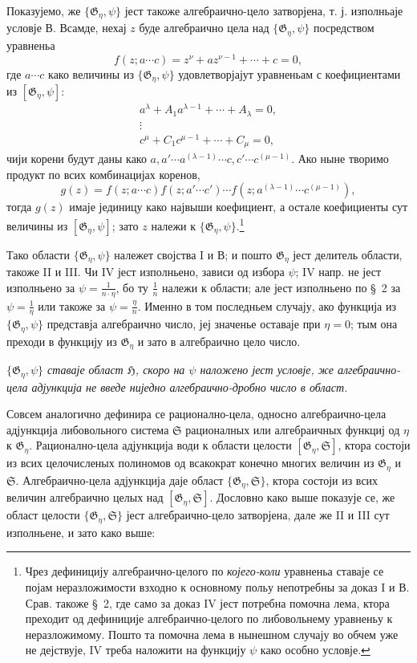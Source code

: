﻿\documentclass[11pt]{article}
\newlength{\sectionfourpageextra}
\begin{document}
Показујемо, же $\{\mathfrak G_\eta,\psi\}$ јест такоже алгебраично-цело
затворјена, т. ј. изполньаје условје В. Всамде, нехај $z$ буде алгебраично
цела над $\{\mathfrak G_\eta,\psi\}$ посредством уравненьа
\enlargethispage{\sectionfourpageextra}
\[
 f(z;a\cdots c)=z^\nu+a z^{\nu-1}+\cdots+c=0,
\]
где $a\cdots c$ како величины из $\{\mathfrak G_\eta,\psi\}$ удовлетворјајут
уравненьам с коефициентами из $[\mathfrak G_\eta,\psi]$:
\[
\begin{gathered}
 a^\lambda+A_1a^{\lambda-1}+\cdots+A_\lambda=0,\\
 \vdots\\
 c^\mu+C_1c^{\mu-1}+\cdots+C_\mu=0,
\end{gathered}
\]
чији корени будут даны како
$a,a'\cdots a^{(\lambda-1)}\cdots c,c'\cdots c^{(\mu-1)}$. Ако ныне творимо
продукт по всих комбинацијах коренов,
\[
 g(z)=f(z;a\cdots c)f(z;a'\cdots c')\cdots
      f(z;a^{(\lambda-1)}\cdots c^{(\mu-1)}),
\]
тогда $g(z)$ имаје јединицу како највыши коефициент, а остале коефициенты сут
величины из $[\mathfrak G_\eta,\psi]$; зато $z$ належи к
$\{\mathfrak G_\eta,\psi\}$.\footnote{Чрез дефиницију алгебраично-целого по
{\itshape којего-коли} уравненьа ставаје се појам неразложимости взходно к
основному польу непотребны за доказ I и В. Срав. такоже \S\ 2, где само за
доказ IV јест потребна помочна лема, ктора преходит од дефиниције
алгебраично-целого по либовольнему уравненьу к неразложимому. Пошто та помочна
лема в нынешном случају во обчем уже не дејствује, IV треба наложити на
функцију $\psi$ како особно условје.}

Тако области $\{\mathfrak G_\eta,\psi\}$ належет својства I и В; и пошто
$\mathfrak G_\eta$ јест делитель области, такоже II и III. Чи IV јест
изполньено, зависи од избора $\psi$; IV напр. не јест изполньено за
$\psi=\frac{1}{n\cdot\eta}$, бо ту $\frac1n$ належи к области; але јест
изполньено по \S\ 2 за $\psi=\frac1\eta$ или такоже за $\psi=\frac{\eta}{n}$.
Именно в том последньем случају, ако функција из $\{\mathfrak G_\eta,\psi\}$
представја алгебраично число, јеј значенье оставаје при $\eta=0$; тым она
преходи в функцију из $\mathfrak G_\eta$ и зато в алгебраично цело число.

{\itshape $\{\mathfrak G_\eta,\psi\}$ ставаје област $\mathfrak H$, скоро на
$\psi$ наложено јест условје, же алгебраично-цела адјункција не введе ниједно
алгебраично-дробно число в област.}

Совсем аналогично дефинира се рационално-цела, односно алгебраично-цела
адјункција либовольного система $\mathfrak S$ рационалных или алгебраичных
функциј од $\eta$ к $\mathfrak G_\eta$. Рационално-цела адјункција води к
области целости $[\mathfrak G_\eta,\mathfrak S]$, ктора состоји из всих
целочисленых полиномов од всакократ конечно многих величин из
$\mathfrak G_\eta$ и $\mathfrak S$. Алгебраично-цела адјункција даје област
$\{\mathfrak G_\eta,\mathfrak S\}$, ктора состоји из всих величин алгебраично
целых над $[\mathfrak G_\eta,\mathfrak S]$. Дословно како выше показује се, же
област целости $\{\mathfrak G_\eta,\mathfrak S\}$ јест алгебраично-цело
затворјена, дале же II и III сут изполньене, и зато како выше:
\end{document}
